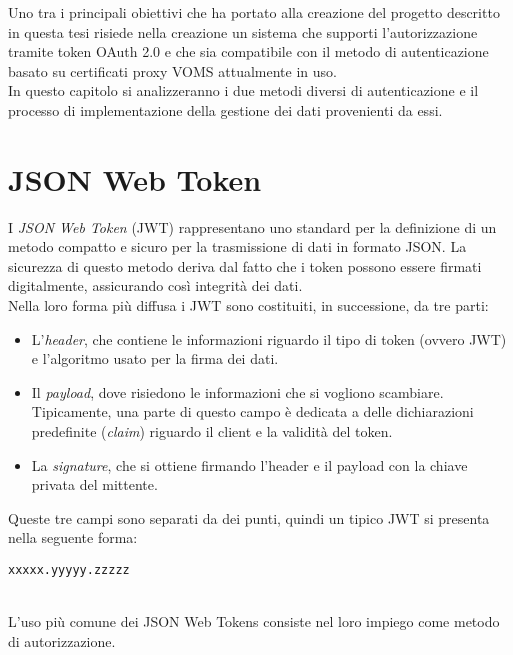 Uno tra i principali obiettivi che ha portato alla creazione del progetto descritto in questa tesi 
risiede nella creazione un sistema che supporti 
l'autorizzazione tramite token OAuth 2.0 e che sia compatibile con il metodo di autenticazione basato su certificati proxy VOMS attualmente in uso.  
\\ In questo capitolo si analizzeranno i due metodi diversi di autenticazione e il processo di implementazione della gestione 
dei dati provenienti da essi.

\section{JSON Web Token}
I \textit{JSON Web Token} (JWT) \cite{JWT_rfc} rappresentano uno standard per la definizione di un metodo 
compatto e sicuro per la trasmissione di dati in formato JSON. La sicurezza di questo metodo deriva dal fatto che i token possono essere firmati digitalmente, assicurando così integrità dei dati.  
\\ Nella loro forma più diffusa i JWT sono costituiti, in successione, da tre parti:
\begin{itemize}
    \item L'\textit{header}, che contiene le informazioni riguardo il tipo di token (ovvero JWT) e 
    l'algoritmo usato per la firma dei dati. 
    \item Il \textit{payload}, dove risiedono le informazioni che si vogliono scambiare. Tipicamente, una parte di questo campo è 
    dedicata a delle dichiarazioni predefinite (\textit{claim}) riguardo il client e la validità del token. 
    \item La \textit{signature}, che si ottiene firmando l'header e il payload con la chiave privata del mittente.
\end{itemize}
Queste tre campi sono separati da dei punti, quindi un tipico JWT si presenta nella seguente forma:
\\ \centerline{\texttt{xxxxx.yyyyy.zzzzz}}
\\ L'uso più comune dei JSON Web Tokens consiste nel loro impiego come metodo di autorizzazione.

